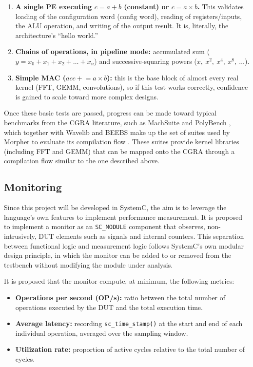 \documentclass[conference]{IEEEtran}
\begin{document}
\begin{enumerate}
    \item \textbf{A single PE executing $c = a + b$ (constant) or $c = a \times b$.} This validates loading of the configuration word (config word), reading of registers/inputs, the ALU operation, and writing of the output result. It is, literally, the architecture's ``hello world.''
    \item \textbf{Chains of operations, in pipeline mode:} accumulated sum ($y = x_0 + x_1 + x_2 + \dots + x_n$) and successive-squaring powers ($x,\ x^2,\ x^4,\ x^8,\ \dots$).
    \item \textbf{Simple MAC ($acc \mathrel{+}= a \times b$):} this is the base block of almost every real kernel (FFT, GEMM, convolutions), so if this test works correctly, confidence is gained to scale toward more complex designs.
\end{enumerate}

Once these basic tests are passed, progress can be made toward typical benchmarks from the CGRA literature, such as MachSuite and PolyBench \cite{PolyBenchC,MachSuite}, which together with Wavelib and BEEBS make up the set of suites used by Morpher to evaluate its compilation flow \cite{Juneja}. These suites provide kernel libraries (including FFT and GEMM) that can be mapped onto the CGRA through a compilation flow similar to the one described above.


\subsection{Monitoring}

Since this project will be developed in SystemC, the aim is to leverage the language's own features to implement performance measurement. It is proposed to implement a monitor as an \texttt{SC\_MODULE} component that observes, non-intrusively, DUT elements such as signals and internal counters. This separation between functional logic and measurement logic follows SystemC's own modular design principle, in which the monitor can be added to or removed from the testbench without modifying the module under analysis.

It is proposed that the monitor compute, at minimum, the following metrics:

\begin{itemize}
    \item \textbf{Operations per second (OP/s):} ratio between the total number of operations executed by the DUT and the total execution time.
    \item \textbf{Average latency:} recording \texttt{sc\_time\_stamp()} at the start and end of each individual operation, averaged over the sampling window.
    \item \textbf{Utilization rate:} proportion of active cycles relative to the total number of cycles.
\end{itemize}
\end{document}
